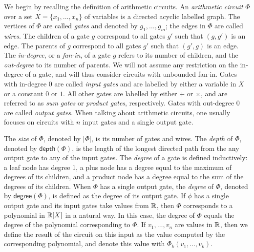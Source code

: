 We begin by recalling the definition of arithmetic circuits. 
An {\em arithmetic circuit} $\Phi$ over a set $X=\{x_1,\ldots,x_n\}$ of variables is a directed
acyclic labelled graph. The vertices of $\Phi$ are called {\em gates} and denoted by $g_1,\ldots,g_m$;
the edges in $\Phi$ are called {\em wires}. The children of a gate $g$ correspond to all gates
$g'$ such that $(g,g')$ is an edge. The parents of $g$ correspond to all gates $g'$ 
such that $(g',g)$ is an edge. The {\em in-degree}, or a {\em fan-in}, of a gate $g$ refers to its number of children, and 
the {\em out-degree} to its number of parents. We will not assume any restriction on the in-degree of a gate, and will thus consider circuits with unbounded fan-in. Gates with in-degree $0$ are called {\em input gates}
and are labelled by either a variable in $X$ or a constant $0$ or $1$. All other gates
are labelled by either $+$ or $\times$, and are referred to as {\em sum gates} or {\em product gates}, respectively.
Gates with out-degree $0$ are called {\em output gates}. When talking about arithmetic circuits, one usually focuses on circuits with $n$ input gates and a single output gate.

The {\em size} of $\Phi$, denoted by $|\Phi|$, is its number of gates and wires. The {\em depth} of $\Phi$, denoted
by $\mathsf{depth}(\Phi)$, is the length of the longest directed path from the any output gate to any of the input gates. The {\em degree} of a gate is defined inductively: a leaf node has degree 1, a plus node has a degree equal to the maximum of  degrees of its children, and a product node has a degree equal to the sum of the degrees of its children. When $\Phi$ has a single output gate, the {\em degree} of $\Phi$, denoted by $\mathsf{degree}(\Phi)$, is defined as the degree of its output gate. If $\phi$ has a single output gate and its input gates take values from $\mathbb{R}$, then $\Phi$ corresponds to a polynomial in $\mathbb{R}[X]$ in a natural way. In this case, the {degree} of $\Phi$ equals the degree of the polynomial corresponding to $\Phi$.
If $v_1,\ldots ,v_n$ are values in $\mathbb{R}$, then we define the result of the circuit on this input as the value computed by the corresponding polynomial, and denote this value with $\Phi_k(v_1,\ldots ,v_k)$.


